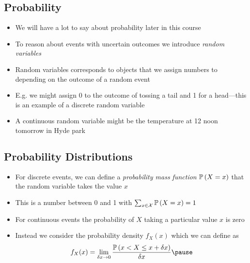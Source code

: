 
\begin{slide}
\section{Probability}

\begin{PauseHighLight}
  \begin{itemize}
  \item We will have a lot to say about probability later in this course\pause
  \item To reason about events with uncertain outcomes we introduce
    \emph{random variables}\pause
  \item Random variables corresponds to objects that we assign numbers
    to depending on the outcome of a random event\pause
  \item E.g. we might assign 0 to the outcome of tossing a tail and 1
    for a head\pause{}---this is an example of a discrete random variable\pauseb
  \item A continuous random variable might be the temperature at 12
    noon tomorrow in Hyde park\pauseb
  \end{itemize}
\end{PauseHighLight}

\end{slide}


\begin{slide}
\section{Probability Distributions}

\begin{PauseHighLight}
  \begin{itemize}
  \item For discrete events, we can define a \emph{probability mass
      function} $\mathbb{P}\left( X=x \right)$ that the random variable takes the value
    $x$\pause
  \item This is a number between 0 and 1 with
    $\sum_{x\in\mathcal{X}}\mathbb{P}\left( X=x \right) =1$\pause
  \item For continuous events the probability of $X$ taking a
    particular value $x$ is zero\pause
  \item Instead we consider the probability density $f_X(x)$ which we
    can define as
    \begin{align*}
      f_X(x) = \lim_{\delta x \rightarrow 0} \frac{\Prob{x<X\leq
      x+\delta x}}{\delta x}\pause
    \end{align*}
  \end{itemize}
\end{PauseHighLight}


\end{slide}

